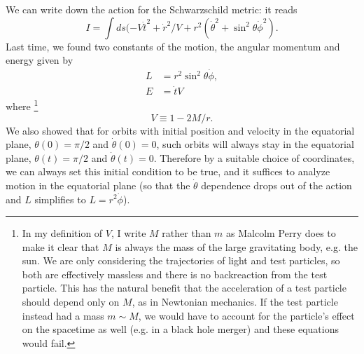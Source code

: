 We can write down the action for the Schwarzschild metric: it reads
\begin{equation}
    I=\int ds (-V\dot t^2 +\dot r^2/V + r^2(\dot\theta^2 +\sin^2\theta \dot\phi^2).
\end{equation}
Last time, we found two constants of the motion, the angular momentum and energy given by
\begin{subequations}
\begin{align}
    L&= r^2\sin^2\theta \dot \phi,\\
    E&= \dot t V
\end{align}
\end{subequations}
where%
    \footnote{In my definition of $V$, I write $M$ rather than $m$ as Malcolm Perry does to make it clear that $M$ is always the mass of the large gravitating body, e.g. the sun. We are only considering the trajectories of light and test particles, so both are effectively massless and there is no backreaction from the test particle. This has the natural benefit that the acceleration of a test particle should depend only on $M$, as in Newtonian mechanics. If the test particle instead had a mass $m\sim M$, we would have to account for the particle's effect on the spacetime as well (e.g. in a black hole merger) and these equations would fail.}
\begin{equation}
    V\equiv 1-2M/r.
\end{equation}
We also showed that for orbits with initial position and velocity in the equatorial plane, $\theta(0)=\pi/2$ and $\dot \theta(0)=0$, such orbits will always stay in the equatorial plane, $\theta(t)=\pi/2$ and $\dot \theta(t)=0$. Therefore by a suitable choice of coordinates, we can always set this initial condition to be true, and it suffices to analyze motion in the equatorial plane (so that the $\dot \theta$ dependence drops out of the action and $L$ simplifies to $L=r^2 \dot \phi$). 

